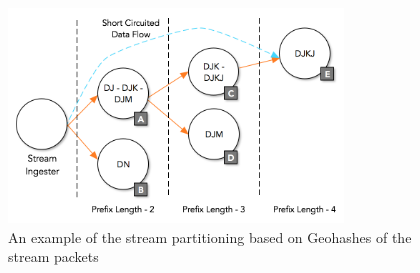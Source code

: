 \begin{figure}
    \centerline{\includegraphics[width=3.5in]{figures/stream-partitioning.png}}
    \caption{An example of the stream partitioning based on Geohashes of the stream packets}
    \label{fig:stream-partitioning}
\end{figure}
